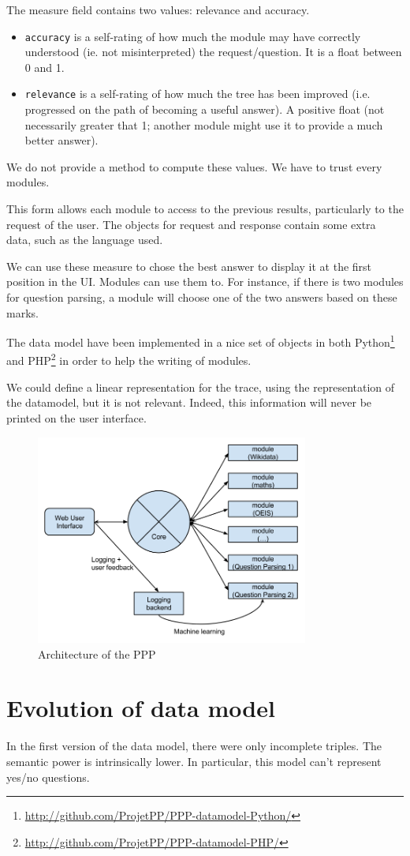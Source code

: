 The measure field contains two values: relevance and accuracy.

\begin{itemize}
    \item \texttt{accuracy} is a self-rating of how much the module may have correctly understood (ie. not misinterpreted) the request/question. It is a float between 0 and 1.
    \item \texttt{relevance} is a self-rating of how much the tree has been improved (i.e. progressed on the path of becoming a useful answer). A positive float (not necessarily greater that 1; another module might use it to provide a much better answer).
\end{itemize}

We do not provide a method to compute these values. We have to trust every modules.

This form allows each module to access to the previous results, particularly to the request of the user. The objects for request and response contain some extra data, such as the language used.

We can use these measure to chose the best answer to display it at the first position in the UI. Modules can use them to. For instance, if there is two modules for question parsing, a module will choose one of the two answers based on these marks.

The data model have been implemented in a nice set of objects in both Python\footnote{\url{http://github.com/ProjetPP/PPP-datamodel-Python/}} and PHP\footnote{\url{http://github.com/ProjetPP/PPP-datamodel-PHP/}} in order to help the writing of modules.

We could define a linear representation for the trace, using the representation of the datamodel, but it is not relevant. Indeed, this information will never be printed on the user interface.

\begin{figure}[!ht]
  \centering
    \label{datamodel:struct}
    \caption{Architecture of the PPP}
    \includegraphics[width=0.8\textwidth]{../ppp_structure.png}
\end{figure}

\section{Evolution of data model}

In the first version of the data model, there were only incomplete triples. The semantic power is intrinsically lower. In particular, this model can't represent yes/no questions.